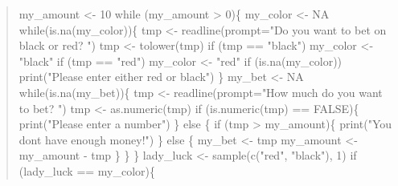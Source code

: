 \documentclass[
  letterpaper,
  DIV=11,
  numbers=noendperiod]{scrreprt}
\newenvironment{Shaded}{\begin{snugshade}}{\end{snugshade}}
\newcommand{\AttributeTok}[1]{\textcolor[rgb]{0.40,0.45,0.13}{#1}}
\newcommand{\ConstantTok}[1]{\textcolor[rgb]{0.56,0.35,0.01}{#1}}
\newcommand{\ControlFlowTok}[1]{\textcolor[rgb]{0.00,0.23,0.31}{#1}}
\newcommand{\DecValTok}[1]{\textcolor[rgb]{0.68,0.00,0.00}{#1}}
\newcommand{\FunctionTok}[1]{\textcolor[rgb]{0.28,0.35,0.67}{#1}}
\newcommand{\NormalTok}[1]{\textcolor[rgb]{0.00,0.23,0.31}{#1}}
\newcommand{\OtherTok}[1]{\textcolor[rgb]{0.00,0.23,0.31}{#1}}
\newcommand{\SpecialCharTok}[1]{\textcolor[rgb]{0.37,0.37,0.37}{#1}}
\newcommand{\StringTok}[1]{\textcolor[rgb]{0.13,0.47,0.30}{#1}}
\begin{document}
\begin{quote}
\begin{Shaded}
\begin{Highlighting}[]
\NormalTok{my\_amount }\OtherTok{\textless{}{-}} \DecValTok{10}
\ControlFlowTok{while}\NormalTok{ (my\_amount }\SpecialCharTok{\textgreater{}} \DecValTok{0}\NormalTok{)\{}
\NormalTok{  my\_color }\OtherTok{\textless{}{-}} \ConstantTok{NA}
  \ControlFlowTok{while}\NormalTok{(}\FunctionTok{is.na}\NormalTok{(my\_color))\{}
\NormalTok{    tmp }\OtherTok{\textless{}{-}} \FunctionTok{readline}\NormalTok{(}\AttributeTok{prompt=}\StringTok{"Do you want to bet on black or red? "}\NormalTok{)}
\NormalTok{    tmp }\OtherTok{\textless{}{-}} \FunctionTok{tolower}\NormalTok{(tmp)}
    \ControlFlowTok{if}\NormalTok{ (tmp }\SpecialCharTok{==} \StringTok{"black"}\NormalTok{) my\_color }\OtherTok{\textless{}{-}} \StringTok{"black"}
    \ControlFlowTok{if}\NormalTok{ (tmp }\SpecialCharTok{==} \StringTok{"red"}\NormalTok{) my\_color }\OtherTok{\textless{}{-}} \StringTok{"red"}
    \ControlFlowTok{if}\NormalTok{ (}\FunctionTok{is.na}\NormalTok{(my\_color)) }\FunctionTok{print}\NormalTok{(}\StringTok{"Please enter either red or black"}\NormalTok{)}
\NormalTok{  \}}
\NormalTok{  my\_bet }\OtherTok{\textless{}{-}} \ConstantTok{NA}
  \ControlFlowTok{while}\NormalTok{(}\FunctionTok{is.na}\NormalTok{(my\_bet))\{}
\NormalTok{    tmp }\OtherTok{\textless{}{-}} \FunctionTok{readline}\NormalTok{(}\AttributeTok{prompt=}\StringTok{"How much do you want to bet? "}\NormalTok{)}
\NormalTok{    tmp }\OtherTok{\textless{}{-}} \FunctionTok{as.numeric}\NormalTok{(tmp)}
    \ControlFlowTok{if}\NormalTok{ (}\FunctionTok{is.numeric}\NormalTok{(tmp) }\SpecialCharTok{==} \ConstantTok{FALSE}\NormalTok{)\{}
      \FunctionTok{print}\NormalTok{(}\StringTok{"Please enter a number"}\NormalTok{)}
\NormalTok{    \} }\ControlFlowTok{else}\NormalTok{ \{}
      \ControlFlowTok{if}\NormalTok{ (tmp }\SpecialCharTok{\textgreater{}}\NormalTok{ my\_amount)\{}
        \FunctionTok{print}\NormalTok{(}\StringTok{"You don\textquotesingle{}t have enough money!"}\NormalTok{)}
\NormalTok{      \} }\ControlFlowTok{else}\NormalTok{ \{}
\NormalTok{        my\_bet }\OtherTok{\textless{}{-}}\NormalTok{ tmp}
\NormalTok{        my\_amount }\OtherTok{\textless{}{-}}\NormalTok{ my\_amount }\SpecialCharTok{{-}}\NormalTok{ tmp}
\NormalTok{      \}}
\NormalTok{    \}}
\NormalTok{  \}}
\NormalTok{  lady\_luck }\OtherTok{\textless{}{-}} \FunctionTok{sample}\NormalTok{(}\FunctionTok{c}\NormalTok{(}\StringTok{"red"}\NormalTok{, }\StringTok{"black"}\NormalTok{), }\DecValTok{1}\NormalTok{)}
  \ControlFlowTok{if}\NormalTok{ (lady\_luck }\SpecialCharTok{==}\NormalTok{ my\_color)\{}

\end{Highlighting}
\end{Shaded}
\end{quote}
\end{document}
